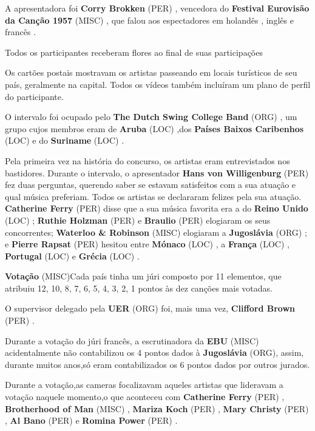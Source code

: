 \documentclass[12pt,a4paper]{article}
\begin{document}
A apresentadora foi \textbf{Corry Brokken} (PER) , vencedora do \textbf{Festival Eurovisão da Canção 1957} (MISC) , que falou aos espectadores em holandês , inglês e francês .

Todos os participantes receberam flores ao final de suas participações

Os cartões postais mostravam os artistas passeando em locais turísticos de seu país, geralmente na capital. Todos os vídeos também incluíram um plano de perfil do participante.

O intervalo foi ocupado pelo \textbf{The Dutch Swing College Band} (ORG) , um grupo cujos membros eram de \textbf{Aruba} (LOC) ,dos \textbf{Países Baixos Caribenhos} (LOC) e do \textbf{Suriname} (LOC) .

Pela primeira vez na história do concurso, os artistas eram entrevistados nos bastidores. Durante o intervalo, o apresentador \textbf{Hans von Willigenburg} (PER) fez duas perguntas, querendo saber se estavam satisfeitos com a sua atuação e qual música preferiam. Todos os artistas se declararam felizes pela sua atuação. \textbf{Catherine Ferry} (PER) disse que a sua música favorita era a do \textbf{Reino Unido} (LOC) ; \textbf{Ruthie Holzman} (PER) e \textbf{Braulio} (PER) elogiaram os seus concorrentes; \textbf{Waterloo \& Robinson} (MISC) elogiaram a \textbf{Jugoslávia} (ORG) ; e \textbf{Pierre Rapsat} (PER) hesitou entre \textbf{Mónaco} (LOC) , a \textbf{França} (LOC) , \textbf{Portugal} (LOC) e \textbf{Grécia} (LOC) .



\textbf{Votação} (MISC)Cada país tinha um júri composto por 11 elementos, que atribuiu 12, 10, 8, 7, 6, 5, 4, 3, 2, 1 pontos às dez canções mais votadas.

O supervisor delegado pela \textbf{UER} (ORG) foi, mais uma vez, \textbf{Clifford Brown} (PER) .

Durante a votação do júri francês, a escrutinadora da \textbf{EBU} (MISC) acidentalmente não contabilizou os 4 pontos dados à \textbf{Jugoslávia} (ORG), assim, durante muitos anos,só eram contabilizados os 6 pontos dados por outros jurados.

Durante a votação,as cameras focalizavam aqueles artistas que lideravam a votação naquele momento,o que aconteceu com \textbf{Catherine Ferry} (PER) , \textbf{Brotherhood of Man} (MISC) , \textbf{Mariza Koch} (PER) , \textbf{Mary Christy} (PER) , \textbf{Al Bano} (PER) e \textbf{Romina Power} (PER) .
\end{document}
